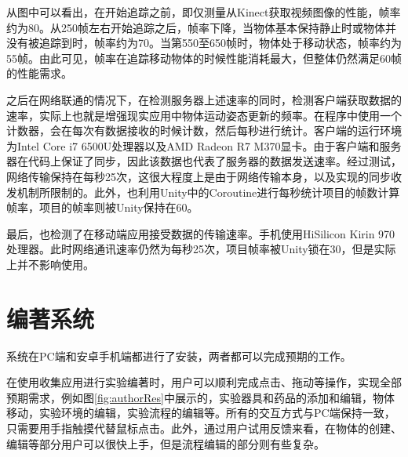 从图中可以看出，在开始追踪之前，即仅测量从Kinect获取视频图像的性能，帧率约为80。从250帧左右开始追踪之后，帧率下降，当物体基本保持静止时或物体并没有被追踪到时，帧率约为70。当第550至650帧时，物体处于移动状态，帧率约为55帧。由此可见，帧率在追踪移动物体的时候性能消耗最大，但整体仍然满足60帧的性能需求。

之后在网络联通的情况下，在检测服务器上述速率的同时，检测客户端获取数据的速率，实际上也就是增强现实应用中物体运动姿态更新的频率。在程序中使用一个计数器，会在每次有数据接收的时候计数，然后每秒进行统计。客户端的运行环境为Intel Core i7 6500U处理器以及AMD Radeon R7 M370显卡。由于客户端和服务器在代码上保证了同步，因此该数据也代表了服务器的数据发送速率。经过测试，网络传输保持在每秒25次，这很大程度上是由于网络传输本身，以及实现的同步收发机制所限制的。此外，也利用Unity中的Coroutine进行每秒统计项目的帧数计算帧率，项目的帧率则被Unity保持在60。

最后，也检测了在移动端应用接受数据的传输速率。手机使用HiSilicon Kirin 970处理器。此时网络通讯速率仍然为每秒25次，项目帧率被Unity锁在30，但是实际上并不影响使用。

\section{编著系统}
系统在PC端和安卓手机端都进行了安装，两者都可以完成预期的工作。

在使用收集应用进行实验编著时，用户可以顺利完成点击、拖动等操作，实现全部预期需求，例如图\ref{fig:authorRes}中展示的，实验器具和药品的添加和编辑，物体移动，实验环境的编辑，实验流程的编辑等。所有的交互方式与PC端保持一致，只需要用手指触摸代替鼠标点击。此外，通过用户试用反馈来看，在物体的创建、编辑等部分用户可以很快上手，但是流程编辑的部分则有些复杂。

